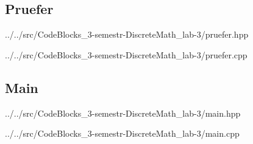 \newpage

\subsection{Pruefer}


{../../src/CodeBlocks_3-semestr-DiscreteMath_lab-3/pruefer.hpp}


{../../src/CodeBlocks_3-semestr-DiscreteMath_lab-3/pruefer.cpp}

\newpage

\subsection{Main}


{../../src/CodeBlocks_3-semestr-DiscreteMath_lab-3/main.hpp}


{../../src/CodeBlocks_3-semestr-DiscreteMath_lab-3/main.cpp}

\newpage

